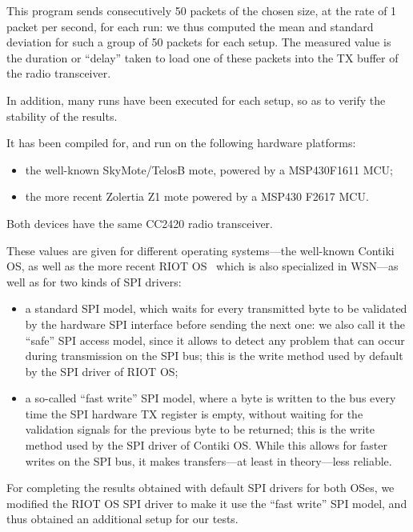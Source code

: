 \documentclass[10pt]{ewsn-proc}
\begin{document}
This program sends consecutively 50 packets of the chosen size, at the rate
of 1 packet per second, for each run: we thus computed the mean and
standard deviation for such a group of 50 packets for each setup.
The measured value is the duration or ``delay'' taken to load one of these
packets into the TX buffer of the radio transceiver.

In addition, many runs have been executed for each setup, so as to verify
the stability of the results.

It has been compiled for, and run on the following hardware platforms:
\begin{itemize}
\item the well-known SkyMote/TelosB mote, powered by a MSP430F1611 MCU;
\item the more recent Zolertia Z1 mote powered by a MSP430 F2617 MCU.
\end{itemize}

\smallskip

Both devices have the same CC2420 radio transceiver.

\medskip

These values are given for different operating systems---the well-known
Contiki OS, as well as the more recent RIOT OS~\cite{RIOT} which is also
specialized in WSN---as well as for two kinds of SPI drivers:
\begin{itemize}
\item a standard SPI model, which waits for every transmitted byte to be
validated by the hardware SPI interface before sending the next one:
we also call it the ``safe'' SPI access model, since it allows to detect
any problem that can occur during transmission on the SPI bus; this is
the write method used by default by the SPI driver of RIOT OS;
\item a so-called ``fast write'' SPI model, where a byte is written to
the bus every time the SPI hardware TX register is empty, without waiting
for the validation signals for the previous byte to be returned; this is
the write method used by the SPI driver of Contiki OS. While this allows
for faster writes on the SPI bus, it makes transfers---at least in
theory---less reliable.
\end{itemize}

\medskip

For completing the results obtained with default SPI drivers for both OSes,
we modified the RIOT OS SPI driver to make it use the ``fast write''
SPI model, and thus obtained an additional setup for our tests.
\end{document}
